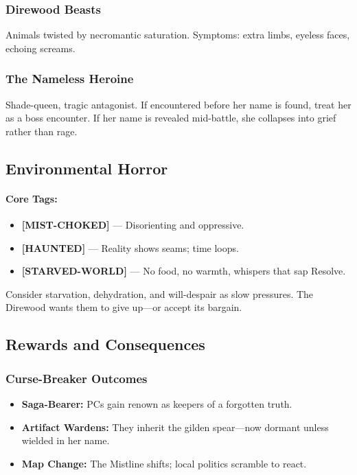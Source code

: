 \documentclass[11pt]{article}
\begin{document}
\subsubsection*{Direwood Beasts}

Animals twisted by necromantic saturation.  
Symptoms: extra limbs, eyeless faces, echoing screams.

\subsubsection*{The Nameless Heroine}

Shade-queen, tragic antagonist.  
If encountered before her name is found, treat her as a boss encounter.  
If her name is revealed mid-battle, she collapses into grief rather than rage.

\subsection{Environmental Horror}

\paragraph{Core Tags:}
\begin{itemize}
  \item \textbf{[MIST-CHOKED]} --- Disorienting and oppressive.
  \item \textbf{[HAUNTED]} --- Reality shows seams; time loops.
  \item \textbf{[STARVED-WORLD]} --- No food, no warmth, whispers that sap Resolve.
\end{itemize}

Consider starvation, dehydration, and will-despair as slow pressures.  
The Direwood wants them to give up---or accept its bargain.

\subsection{Rewards and Consequences}

\subsubsection*{Curse-Breaker Outcomes}

\begin{itemize}
  \item \textbf{Saga-Bearer:} PCs gain renown as keepers of a forgotten truth.
  \item \textbf{Artifact Wardens:} They inherit the gilden spear---now dormant unless wielded in her name.
  \item \textbf{Map Change:} The Mistline shifts; local politics scramble to react.
\end{itemize}
\end{document}

